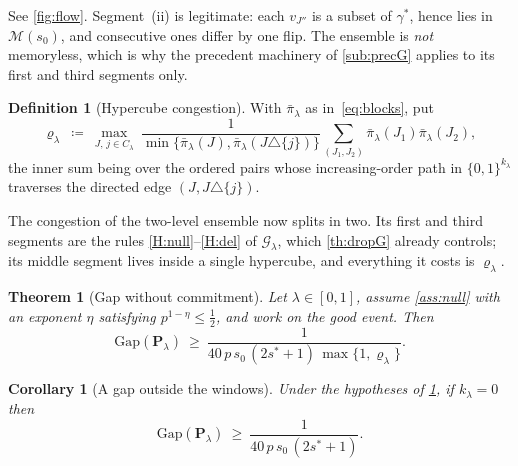 \documentclass[aos]{imsart}
\theoremstyle{plain}
\newtheorem{theorem}{Theorem}[section]
\newtheorem{corollary}{Corollary}[section]
\theoremstyle{definition}
\newtheorem{definition}{Definition}[section]
\begin{document}
    See \cref{fig:flow}. Segment~(ii) is legitimate: each $v_{J''}$ is a
    subset of $\gamma^{\ast}$, hence lies in $\mathscr{M}(s_0)$, and consecutive
    ones differ by one flip. The ensemble is \emph{not} memoryless, which is why
    the precedent machinery of \cref{sub:precG} applies to its first and
    third segments only.

    \begin{definition}[Hypercube congestion]
        \label{def:rholam}
        With $\bar\pi_\lambda$ as in~\eqref{eq:blocks}, put
        \begin{equation}
            \label{eq:rholam}
            \varrho_\lambda\ \coloneq\ \max_{J,\,j\in C_\lambda}\
            \frac{1}{\min\{\bar\pi_\lambda(J),\bar\pi_\lambda(J\triangle
            \{j\})\}}
            \sum_{(J_1,J_2)}\bar\pi_\lambda(J_1)\bar\pi_\lambda(J_2),
        \end{equation}
        the inner sum being over the ordered pairs whose increasing-order path
        in $\{0,1\}^{k_\lambda}$ traverses the directed edge
        $(J,J\triangle\{j\})$.
    \end{definition}

    The congestion of the two-level ensemble now splits in two. Its first
    and third segments are the rules \ref{H:null}--\ref{H:del} of
    $\mathcal{G}_\lambda$, which \cref{th:dropG} already controls; its
    middle segment lives inside a single hypercube, and everything it costs
    is $\varrho_\lambda$.

    \begin{theorem}[Gap without commitment]
        \label{th:gapflow}
        Let $\lambda\in[0,1]$, assume \cref{ass:null} with an exponent $\eta$
        satisfying $p^{1-\eta}\leq\tfrac12$, and work on the good event. Then
        \begin{equation}
            \label{eq:gapflow}
            \mathrm{Gap}(\mathbf{P}_\lambda)\ \geq\
            \frac{1}{40\,p\,s_0\,(2s^{\ast}+1)\,\max\{1,\varrho_\lambda\}} .
        \end{equation}
    \end{theorem}

    \begin{corollary}[A gap outside the windows]
        \label{cor:gapwindow}
        Under the hypotheses of \cref{th:gapflow}, if $k_\lambda=0$ then
        \begin{equation}
            \label{eq:gapwindow}
            \mathrm{Gap}(\mathbf{P}_\lambda)\ \geq\
            \frac{1}{40\,p\,s_0\,(2s^{\ast}+1)} .
        \end{equation}
    \end{corollary}
\end{document}
